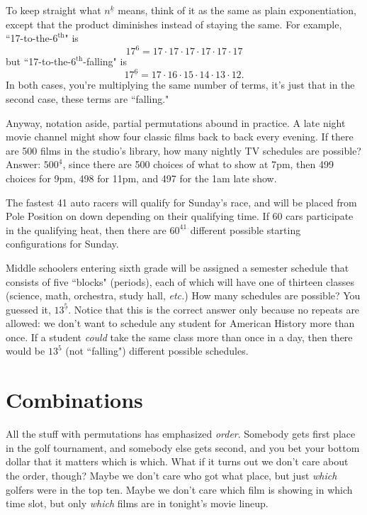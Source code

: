 To keep straight what $n^{\underline{k}}$ means, think of it as the same as
plain exponentiation, except that the product diminishes instead of staying
the same. For example, ``17-to-the-$6^{\text{th}}$" is
\[
17^6 = 17 \cdot 17 \cdot 17 \cdot 17 \cdot 17 \cdot 17
\]
but ``17-to-the-$6^{\text{th}}$-falling" is
\[
17^{\underline{6}} = 17 \cdot 16 \cdot 15 \cdot 14 \cdot 13 \cdot 12.
\]
In both cases, you're multiplying the same number of terms, it's just that
in the second case, these terms are ``falling."

Anyway, notation aside, partial permutations abound in practice. A late
night movie channel might show four classic films back to back every
evening. If there are 500 films in the studio's library, how many nightly
TV schedules are possible? Answer: $500^{\underline{4}}$, since there are
500 choices of what to show at 7pm, then 499 choices for 9pm, 498 for 11pm,
and 497 for the 1am late show.

The fastest 41 auto racers will qualify for Sunday's race, and will be
placed from Pole Position on down depending on their qualifying time. If 60
cars participate in the qualifying heat, then there are
$60^{\underline{41}}$ different possible starting configurations for
Sunday.

Middle schoolers entering sixth grade will be assigned a semester schedule
that consists of five ``blocks" (periods), each of which will have one of
thirteen classes (science, math, orchestra, study hall, \textit{etc.}) How
many schedules are possible? You guessed it, $13^{\underline{5}}$. Notice
that this is the correct answer only because no repeats are allowed: we
don't want to schedule any student for American History more than once.  If
a student \textit{could} take the same class more than once in a day, then
there would be $13^5$ (not ``falling") different possible schedules.


\section{Combinations}

All the stuff with permutations has emphasized \textit{order}. Somebody
gets first place in the golf tournament, and somebody else gets second, and
you bet your bottom dollar that it matters which is which. What if it turns
out we don't care about the order, though? Maybe we don't care who got what
place, but just \textit{which} golfers were in the top ten. Maybe we don't
care which film is showing in which time slot, but only \textit{which}
films are in tonight's movie lineup.


